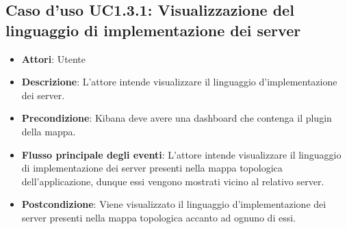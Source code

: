 \subsection{Caso d'uso UC1.3.1: Visualizzazione del linguaggio di implementazione dei server}
\begin{itemize}
\item \textbf{Attori}: Utente
\item \textbf{Descrizione}: L'attore intende visualizzare il linguaggio d'implementazione dei server.

\item \textbf{Precondizione}: Kibana deve avere una dashboard che contenga il plugin della mappa.

\item \textbf{Flusso principale degli eventi}: L'attore intende visualizzare il linguaggio di implementazione dei server presenti nella mappa topologica dell'applicazione, dunque essi vengono mostrati vicino al relativo server.
\item \textbf{Postcondizione}: Viene visualizzato il linguaggio d'implementazione dei server presenti nella mappa topologica accanto ad ognuno di essi.
\end{itemize}

